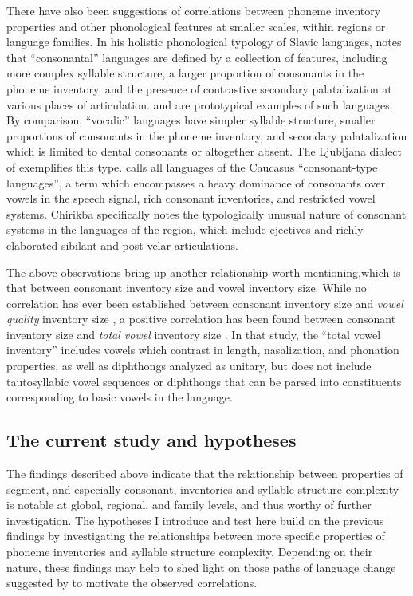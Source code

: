   There have also been suggestions of correlations between phoneme inventory properties and other phonological features at smaller scales, within regions or language families. In his holistic phonological typology of Slavic languages, \citet{Isačenko1939/1940} notes that ``consonantal'' languages are defined by a collection of features, including more complex syllable structure, a larger proportion of consonants in the phoneme inventory, and the presence of contrastive secondary palatalization at various places of articulation.  and  are prototypical examples of such languages. By comparison, ``vocalic'' languages have simpler syllable structure, smaller proportions of consonants in the phoneme inventory, and secondary palatalization which is limited to dental consonants or altogether absent. The Ljubljana dialect of  exemplifies this type. \citet[43]{Chirikba2008} calls all languages of the Caucasus “consonant-type languages”, a term which encompasses a heavy dominance of consonants over vowels in the speech signal, rich consonant inventories, and restricted vowel systems. Chirikba specifically notes the typologically unusual nature of consonant systems in the languages of the region, which include ejectives and richly elaborated sibilant and post-velar articulations.

  The above observations bring up another relationship worth mentioning,\linebreak which is that between consonant inventory size and vowel inventory size. While no correlation has ever been established between consonant inventory size and \textit{vowel quality} inventory size \citep{Maddieson2013c}, a positive correlation has been found between consonant inventory size and \textit{total vowel} inventory size \citep{Maddieson2011}. In that study, the ``total vowel inventory'' includes vowels which contrast in length, nasalization, and phonation properties, as well as diphthongs analyzed as unitary, but does not include tautosyllabic vowel sequences or diphthongs that can be parsed into constituents corresponding to basic vowels in the language.

\subsection{The current study and hypotheses}\label{sec:4.1.4}

  The findings described above indicate that the relationship between properties of segment, and especially consonant, inventories and syllable structure complexity is notable at global, regional, and family levels, and thus worthy of further investigation. The hypotheses I introduce and test here build on the previous findings by investigating the relationships between more specific properties of phoneme inventories and syllable structure complexity. Depending on their nature, these findings may help to shed light on those paths of language change suggested by \citet{Maddieson2006} to motivate the observed correlations.

